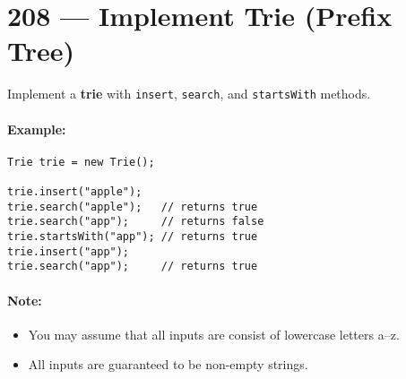 \section{208 --- Implement Trie (Prefix Tree)}
Implement a \textbf{trie} with \texttt{insert}, \texttt{search}, and \texttt{startsWith} methods.
\paragraph{Example:}
\setcounter{lstlisting}{0}
\begin{lstlisting}[style=customc, caption={Example}]
Trie trie = new Trie();

trie.insert("apple");
trie.search("apple");   // returns true
trie.search("app");     // returns false
trie.startsWith("app"); // returns true
trie.insert("app");   
trie.search("app");     // returns true
\end{lstlisting}
\paragraph{Note:}
\begin{itemize}
\item You may assume that all inputs are consist of lowercase letters a--z.
\item All inputs are guaranteed to be non-empty strings.
\end{itemize}
